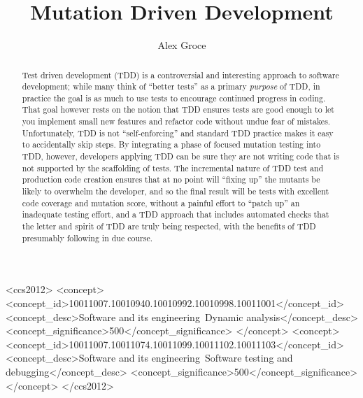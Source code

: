 \documentclass[sigplan,screen]{acmart}
\begin{document}
\title{Mutation Driven Development}

\author{Alex Groce}

\renewcommand{\shortauthors}{Alex Groce}

\begin{abstract}

\end{abstract}

\begin{CCSXML}
<ccs2012>
<concept>
<concept_id>10011007.10010940.10010992.10010998.10011001</concept_id>
<concept_desc>Software and its engineering~Dynamic analysis</concept_desc>
<concept_significance>500</concept_significance>
</concept>
<concept>
<concept_id>10011007.10011074.10011099.10011102.10011103</concept_id>
<concept_desc>Software and its engineering~Software testing and debugging</concept_desc>
<concept_significance>500</concept_significance>
</concept>
</ccs2012>
\end{CCSXML}





\begin{abstract}
Test driven development (TDD) is a controversial and interesting approach to
software development; while many think of ``better tests'' as a
primary \emph{purpose} of TDD, in practice the goal is as much to use
tests to encourage continued progress in coding.   That goal however
rests on the notion that TDD ensures tests are good enough to let you
implement small new features and refactor code without undue fear of
mistakes.  Unfortunately, TDD is not ``self-enforcing'' and standard
TDD practice makes it easy to accidentally skip steps.  By integrating
a phase of focused mutation testing into TDD, however, developers
applying TDD can be sure they are not writing code that is not
supported by the scaffolding of tests.  The incremental nature of TDD
test and production code creation ensures that at no point will
``fixing up'' the mutants be likely to overwhelm the developer, and so
the final result will be tests with excellent code coverage and
mutation score, without a painful effort to ``patch up'' an inadequate
testing effort, and a TDD approach that includes automated checks that
the letter and spirit of TDD are truly being respected, with the
benefits of TDD presumably following in due course.
  \end{abstract}
\end{document}
